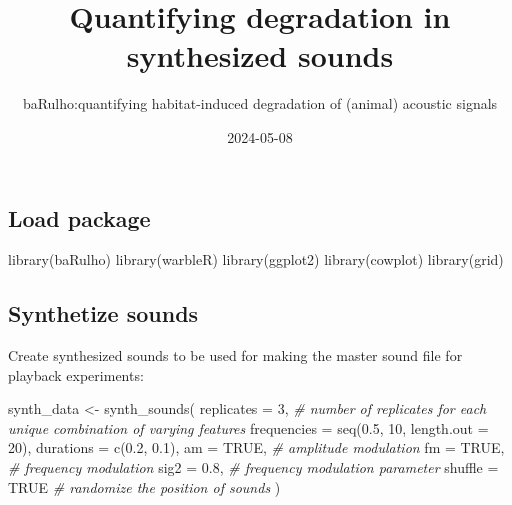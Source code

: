 \documentclass[
  letterpaper,
  DIV=11,
  numbers=noendperiod]{scrartcl}
\title{Quantifying degradation in synthesized sounds}
\subtitle{baRulho:quantifying habitat-induced degradation of (animal)
acoustic signals}
\author{}
\date{2024-05-08}
\newenvironment{Shaded}{\begin{snugshade}}{\end{snugshade}}
\newcommand{\AttributeTok}[1]{\textcolor[rgb]{0.49,0.56,0.16}{#1}}
\newcommand{\CommentTok}[1]{\textcolor[rgb]{0.38,0.63,0.69}{\textit{#1}}}
\newcommand{\ConstantTok}[1]{\textcolor[rgb]{0.53,0.00,0.00}{#1}}
\newcommand{\DecValTok}[1]{\textcolor[rgb]{0.25,0.63,0.44}{#1}}
\newcommand{\FloatTok}[1]{\textcolor[rgb]{0.25,0.63,0.44}{#1}}
\newcommand{\FunctionTok}[1]{\textcolor[rgb]{0.02,0.16,0.49}{#1}}
\newcommand{\NormalTok}[1]{\textcolor[rgb]{0.00,0.44,0.13}{#1}}
\newcommand{\OtherTok}[1]{\textcolor[rgb]{0.00,0.44,0.13}{#1}}
\renewcommand*\contentsname{Table of contents}
\newcommand\contentsname{Table of contents}
\begin{document}
\maketitle
\renewcommand*\contentsname{Table of contents}
{
\hypersetup{linkcolor=}
\setcounter{tocdepth}{3}
\tableofcontents
}
\hypertarget{load-package}{%
\subsection{Load package}\label{load-package}}

\begin{Shaded}
\begin{Highlighting}[numbers=left,,]
\FunctionTok{library}\NormalTok{(baRulho)}
\FunctionTok{library}\NormalTok{(warbleR)}
\FunctionTok{library}\NormalTok{(ggplot2)}
\FunctionTok{library}\NormalTok{(cowplot)}
\FunctionTok{library}\NormalTok{(grid)}
\end{Highlighting}
\end{Shaded}

\hypertarget{synthetize-sounds}{%
\subsection{Synthetize sounds}\label{synthetize-sounds}}

Create synthesized sounds to be used for making the master sound file
for playback experiments:

\begin{Shaded}
\begin{Highlighting}[numbers=left,,]
\NormalTok{synth\_data }\OtherTok{\textless{}{-}}
    \FunctionTok{synth\_sounds}\NormalTok{(}
        \AttributeTok{replicates =} \DecValTok{3}\NormalTok{, }\CommentTok{\# number of replicates for each unique combination of varying features}
        \AttributeTok{frequencies =} \FunctionTok{seq}\NormalTok{(}\FloatTok{0.5}\NormalTok{, }\DecValTok{10}\NormalTok{, }\AttributeTok{length.out =} \DecValTok{20}\NormalTok{),}
        \AttributeTok{durations =} \FunctionTok{c}\NormalTok{(}\FloatTok{0.2}\NormalTok{, }\FloatTok{0.1}\NormalTok{),}
        \AttributeTok{am =} \ConstantTok{TRUE}\NormalTok{, }\CommentTok{\# amplitude modulation}
        \AttributeTok{fm =} \ConstantTok{TRUE}\NormalTok{, }\CommentTok{\# frequency modulation}
        \AttributeTok{sig2 =} \FloatTok{0.8}\NormalTok{, }\CommentTok{\# frequency modulation parameter}
        \AttributeTok{shuffle =} \ConstantTok{TRUE} \CommentTok{\# randomize the position of sounds }
\NormalTok{    )}
\end{Highlighting}
\end{Shaded}
\end{document}
